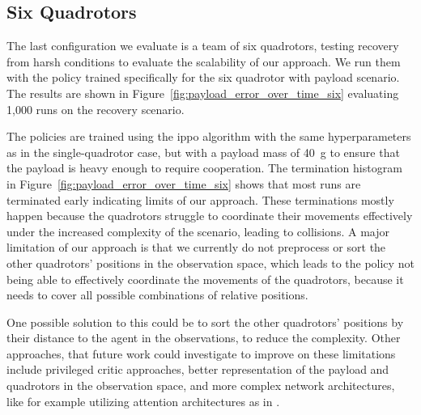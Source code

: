 \subsection{Six Quadrotors}
The last configuration we evaluate is a team of six quadrotors, testing recovery from harsh conditions to evaluate the scalability of our approach. We run them with the policy trained specifically for the six quadrotor with payload scenario. The results are shown in Figure~\ref{fig:payload_error_over_time_six} evaluating 1,000 runs on the recovery scenario.

The policies are trained using the \gls{ippo} algorithm with the same hyperparameters as in the single-quadrotor case, but with a payload mass of 40~g to ensure that the payload is heavy enough to require cooperation.  
The termination histogram in Figure~\ref{fig:payload_error_over_time_six} shows that most runs are terminated early indicating limits of our approach. These terminations mostly happen because the quadrotors struggle to coordinate their movements effectively under the increased complexity of the scenario, leading to collisions. A major limitation of our approach is that we currently do not preprocess or sort the other quadrotors' positions in the observation space, which leads to the policy not being able to effectively coordinate the movements of the quadrotors, because it needs to cover all possible combinations of relative positions. 

One possible solution to this could be to sort the other quadrotors' positions by their distance to the agent in the observations, to reduce the complexity.
Other approaches, that future work could investigate to improve on these limitations include privileged critic approaches, better representation of the payload and quadrotors in the observation space, and more complex network architectures, like for example utilizing attention architectures as in \autocite{huang_collision_2024}.

